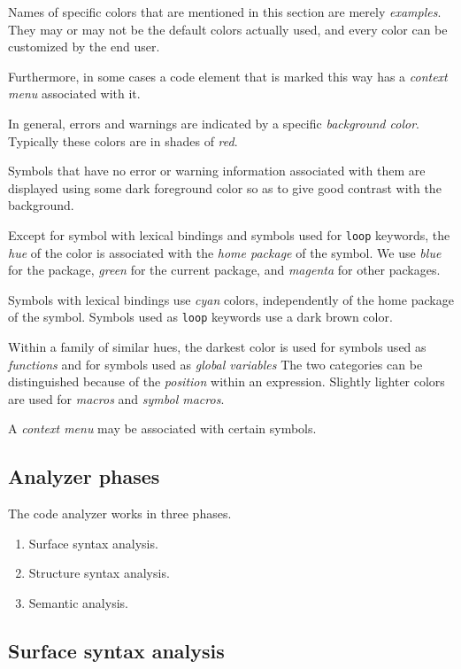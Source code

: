 Names of specific colors that are mentioned in this section are merely
\emph{examples}.  They may or may not be the default colors actually
used, and every color can be customized by the end user. 

Furthermore, in some cases a code element that is marked this way has
a \emph{context menu} associated with it.

In general, errors and warnings are indicated by a specific
\emph{background color}.  Typically these colors are in shades of
\emph{red}. 

Symbols that have no error or warning information associated with them
are displayed using some dark foreground color so as to give good
contrast with the background.  

Except for symbol with lexical bindings and symbols used for
\texttt{loop} keywords, the \emph{hue} of the color is associated with
the \emph{home package} of the symbol.  We use \emph{blue} for the
\commonlisp{} package, \emph{green} for the current package, and
\emph{magenta} for other packages.

Symbols with lexical bindings use \emph{cyan} colors, independently of
the home package of the symbol.  Symbols used as \texttt{loop}
keywords use a dark brown color. 

Within a family of similar hues, the darkest color is used for symbols
used as \emph{functions} and for symbols used as \emph{global
  variables}  The two categories can be distinguished because of the
\emph{position} within an expression.  Slightly lighter colors are
used for \emph{macros} and \emph{symbol macros}.  

A \emph{context menu} may be associated with certain symbols.

\subsection{Analyzer phases}

The code analyzer works in three phases.

\begin{enumerate}
\item Surface syntax analysis.
\item Structure syntax analysis.
\item Semantic analysis.
\end{enumerate}

\subsection{Surface syntax analysis}

